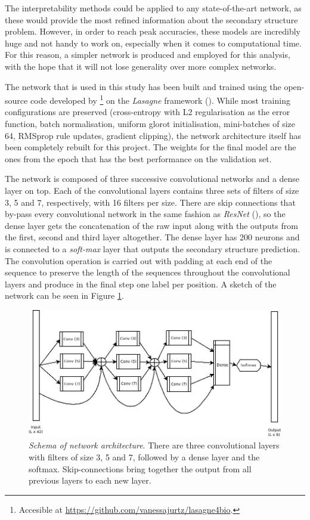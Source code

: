 The interpretability methods could be applied to any state-of-the-art network, as these would provide the most refined information about the secondary structure problem. However, in order to reach peak accuracies, these models are incredibly huge and not handy to work on, especially when it comes to computational time. For this reason, a simpler network is produced and employed for this analysis, with the hope that it will not lose generality over more complex networks.

The network that is used in this study has been built and trained using the open-source code developed by \cite{Jurtz2017}\footnote{Accesible at \url{https://github.com/vanessajurtz/lasagne4bio}.} on the \textit{Lasagne} framework (\cite{Dieleman2015}). While most training configurations are preserved (cross-entropy with L2 regularisation as the error function, batch normalisation, uniform glorot initialisation, mini-batches of size 64, RMSprop rule updates, gradient clipping), the network architecture itself has been completely rebuilt for this project. The weights for the final model are the ones from the epoch that has the best performance on the validation set.

The network is composed of three successive convolutional networks and a dense layer on top. Each of the convolutional layers contains three sets of filters of size 3, 5 and 7, respectively, with 16 filters per size. There are skip connections that by-pass every convolutional network in the same fashion as \textit{ResNet} (\cite{He2015}), so the dense layer gets the concatenation of the raw input along with the outputs from the first, second and third layer altogether.
The dense layer has 200 neurons and is connected to a \textit{soft-max} layer that outputs the secondary structure prediction. The convolution operation is carried out with padding at each end of the sequence to preserve the length of the sequences throughout the convolutional layers and produce in the final step one label per position. A sketch of the network can be seen in Figure \ref{fig:pureConv}.

\begin{figure}
	\centering
	\includegraphics[width=0.8\linewidth]{Figures/pureConv}
	\caption{\textit{Schema of network architecture}. There are three convolutional layers with filters of size 3, 5 and 7, followed by a dense layer and the softmax. Skip-connections bring together the output from all previous layers to each new layer.}
	\label{fig:pureConv}
\end{figure}


